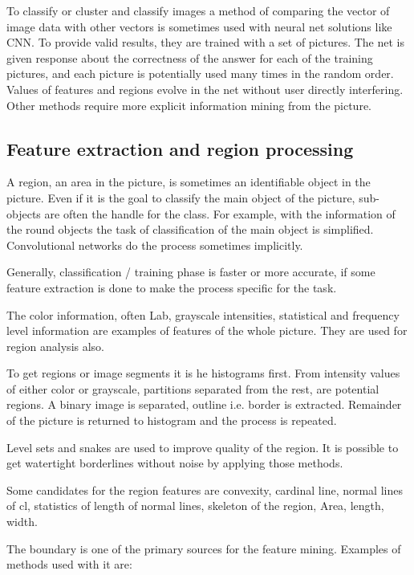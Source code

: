 \documentclass[doc/report.tex]{subfiles}
\begin{document}
To classify or cluster and classify images a method of comparing the vector of
image data with other vectors is sometimes used with neural net solutions like
CNN. To provide valid results, they are trained with a set of pictures. The net
is given response about the correctness of the answer for each of the training
pictures, and each picture is potentially used many times in the random order.
Values of features and regions evolve in the net without user directly
interfering. Other methods require more explicit information mining from the
picture.

\subsection{Feature extraction and region processing}
A region, an area in the picture, is sometimes an identifiable object in the
picture. Even if it is the goal to classify the main object of the picture,
sub-objects are often the handle for the class. For example, with the
information of the round objects the task of classification of the main object
is simplified. Convolutional networks do the process sometimes implicitly.

Generally, classification / training phase is faster or more accurate, if some
feature extraction is done to make the process specific for the task.

The color information, often Lab, grayscale intensities, statistical and
frequency level information are examples of features of the whole picture. They
are used for region analysis also.

To get regions or image segments it is he histograms first. From intensity
values of either color or grayscale, partitions separated from the rest, are
potential regions. A binary image is separated, outline i.e. border is
extracted. Remainder of the picture is returned to histogram and the process is
repeated.

Level sets and snakes are used to improve quality of the region. It is possible
to get watertight borderlines without noise by applying those methods.

Some candidates for the region features are convexity, cardinal line, normal
lines of cl, statistics of length of normal lines, skeleton of the region,
Area, length, width.

The boundary is one of the primary sources for the feature mining. Examples of
methods used with it are:
\end{document}

